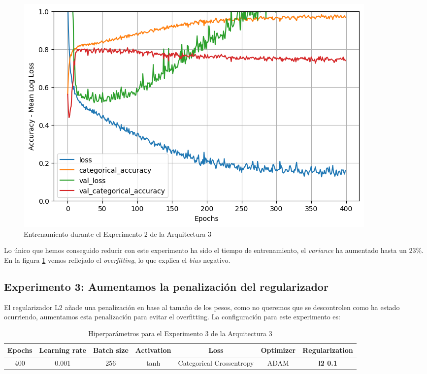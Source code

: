 \documentclass{article}
\begin{document}
			\begin{figure}[!h]
				\begin{center}
					\includegraphics[scale=0.4]{tr-a3-e2.png}		
					\caption{Entrenamiento durante el Experimento 2 de la Arquitectura 3}	
					\label{tr-a3-e2}
				\end{center}
			\end{figure}
			Lo \'unico que hemos conseguido reducir con este experimento ha sido el tiempo de entrenamiento, el \textit{variance} ha aumentado hasta un 23\%.
			En la figura \ref{tr-a3-e2} vemos reflejado el \textit{overfitting}, lo que explica el \textit{bias} negativo.
			
		\subsection{Experimento 3: Aumentamos la penalizaci\'on del regularizador}
		\label{s-a3-e3}
			El regularizador L2 a\~nade una penalizaci\'on en base al tama\~no de los pesos, como no queremos que se descontrolen como ha estado ocurriendo, aumentamos esta penalizaci\'on para evitar el overfitting. La configuraci\'on para este experimento es:
			\begin{table}[!h]
				\begin{tabular}{| c | c | c | c | c | c | c |}
					\textbf{Epochs} & \textbf{Learning rate} & \textbf{Batch size} & \textbf{Activation} & \textbf{Loss} & \textbf{Optimizer} & \textbf{Regularization} \\ \hline
					400 & 0.001 & 256 & tanh & Categorical Crossentropy & ADAM & \textbf{l2 0.1}
				\end{tabular}
				\caption{Hiperpar\'ametros para el Experimento 3 de la Arquitectura 3}
				\label{tab:hip-a3-e3}
			\end{table}
			
\end{document}
